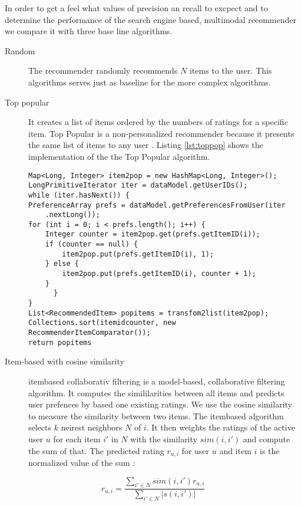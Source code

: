 In order to get a feel what values of precision an recall to excpect and to determine the performance of the search engine based, multimodal recommender we compare it with three base line algorithms. 

\begin{description}
\item[Random] The recommender randomly recommends $N$ items to the user. This algorithms serves just as baseline for the more complex algorithms.
\item[Top popular]  It creates a list of items ordered by the numbers of ratings for a specific item. Top Popular is a non-personalized recommender because it presents the same list of items to any user \cite{Cremonesi}. Listing \ref{lst:toppop} shows the implementation of the the Top Popular algorithm. 

\begin{lstlisting}[label=lst:toppop, caption={Implementation of top popular recommender}]
Map<Long, Integer> item2pop = new HashMap<Long, Integer>();
LongPrimitiveIterator iter = dataModel.getUserIDs();
while (iter.hasNext()) {
PreferenceArray prefs = dataModel.getPreferencesFromUser(iter
	.nextLong());
for (int i = 0; i < prefs.length(); i++) {
	Integer counter = item2pop.get(prefs.getItemID(i));
	if (counter == null) {
		item2pop.put(prefs.getItemID(i), 1);
	} else {
		item2pop.put(prefs.getItemID(i), counter + 1);
	}
      }
}
List<RecommendedItem> popitems = transfom2list(item2pop);
Collections.sort(itemidcounter, new RecommenderItemComparator()); 
return popitems
\end{lstlisting}

\item[Item-based with cosine similarity]  \Gls{itembased} collaborativ filtering is a model-based, collaborative filtering algorithm. It computes the simililarities between all items and predicts user prefences by based one existing ratings. We use the cosine similarity \cite{ekstrand11} to measure the similarity between two items. The \gls{itembased} algorithm selects $k$ neirest neighbors $N$ of $i$. It then weights the ratings of the active user $u$ for each item $i'$ in $N$ with the similarity $sim(i,i')$ and compute the sum of that. The predicted rating $r_{u,i}$ for user $u$ and item $i$ is the normalized value of the sum \cite{jannach11}:

\end{description}
\begin{equation}
  \label{eq:computeprediction}
  r_{u,i} = \frac{\sum_{i' \in N}{sim(i,i') r_{u,i}}}{\sum_{i' \in N}{|s(i,i')|}}
\end{equation}


